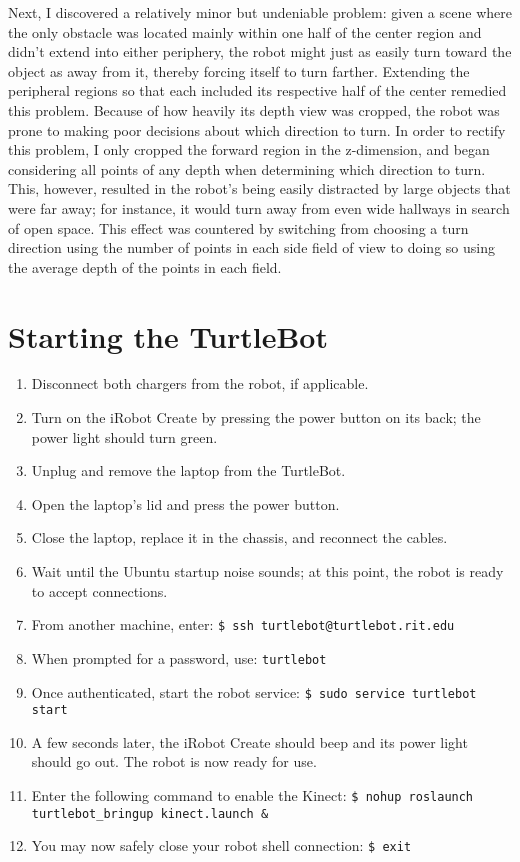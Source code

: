 \documentclass{article}
\begin{document}
Next, I discovered a relatively minor but undeniable problem: given a scene where the only obstacle was located mainly within one half of the center region and didn't extend into either periphery, the robot might just as easily turn toward the object as away from it, thereby forcing itself to turn farther.  Extending the peripheral regions so that each included its respective half of the center remedied this problem.
Because of how heavily its depth view was cropped, the robot was prone to making poor decisions about which direction to turn.  In order to rectify this problem, I only cropped the forward region in the z-dimension, and began considering all points of any depth when determining which direction to turn.  This, however, resulted in the robot's being easily distracted by large objects that were far away; for instance, it would turn away from even wide hallways in search of open space.  This effect was countered by switching from choosing a turn direction using the number of points in each side field of view to doing so using the average depth of the points in each field.

\section{Starting the TurtleBot}
\label{sec:start}
\begin{enumerate}
\item{Disconnect both chargers from the robot, if applicable.}
\item{Turn on the iRobot Create by pressing the power button on its back; the power light should turn green.}
\item{Unplug and remove the laptop from the TurtleBot.}
\item{Open the laptop's lid and press the power button.}
\item{Close the laptop, replace it in the chassis, and reconnect the cables.}
\item{Wait until the Ubuntu startup noise sounds; at this point, the robot is ready to accept connections.}
\item{\label{lst:connopen}From another machine, enter: \texttt{\$\ ssh turtlebot@turtlebot.rit.edu}}
\item{\label{lst:connclose}When prompted for a password, use: \texttt{turtlebot}}
\item{Once authenticated, start the robot service: \texttt{\$\ sudo service turtlebot start}}
\item{A few seconds later, the iRobot Create should beep and its power light should go out.  The robot is now ready for use.}
\item{Enter the following command to enable the Kinect: \texttt{\$\ nohup roslaunch turtlebot\_bringup kinect.launch \&}}
\item{You may now safely close your robot shell connection: \texttt{\$\ exit}}
\end{enumerate}
\end{document}
